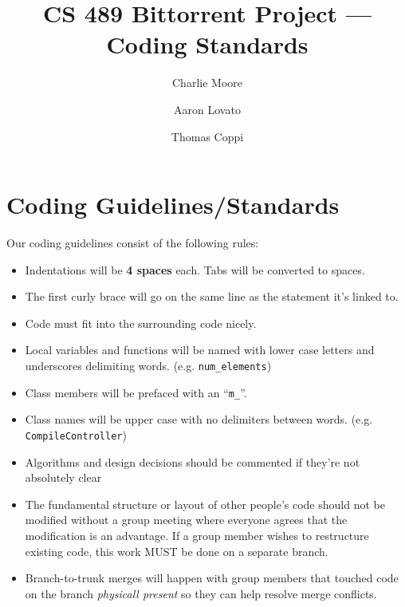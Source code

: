 \documentclass[11pt]{article}
\author{Charlie Moore \and Aaron Lovato \and Thomas Coppi}
\title{CS 489 Bittorrent Project --- Coding Standards}
\begin{document}
\section*{Coding Guidelines/Standards}
Our coding guidelines consist of the following rules:
\begin{itemize}
\item Indentations will be \textbf{4 spaces} each.  Tabs will be converted to
  spaces.
\item The first curly brace will go on the same line as the statement it's
  linked to.
\item Code must fit into the surrounding code nicely.
\item Local variables and functions will be named with lower case letters and
  underscores delimiting words. (e.g. \texttt{num\_elements})
\item Class members will be prefaced with an ``\texttt{m\_}''.
\item Class names will be upper case with no delimiters between words.
  (e.g. \texttt{Compile\-Controller})
\item Algorithms and design decisions should be commented if they're not
  absolutely clear
\item The fundamental structure or layout of other people's code should not be
  modified without a group meeting where everyone agrees that the modification
  is an advantage. If a group member wishes to restructure existing code, this
  work MUST be done on a separate branch.
\item Branch-to-trunk merges will happen with group members that touched code on
  the branch \textit{physicall present} so they can help resolve merge conflicts.
\end{itemize}
\end{document}
